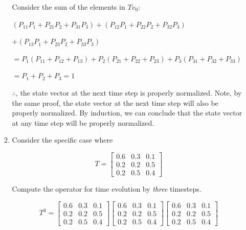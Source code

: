 \documentclass[fleqn]{article}
\makeatletter
\newenvironment{equationCenter}{\@fleqnfalse\begin{equation*}}{\end{equation*}}
\makeatother
\begin{document}
\begin{enumerate}[nolistsep]
\begin{enumerate}
			Consider the sum of the elements in $Tv_0$:
			
			$(P_{11}P_{1} + P_{21}P_{2} + P_{31}P_{3}) + (P_{12}P_{1} + P_{22}P_{2} + P_{32}P_{3})$
			
			$ + (P_{13}P_{1} + P_{23}P_{2} + P_{33}P_{3})$
			
			$ = P_{1}(P_{11} + P_{12} + P_{13}) + P_{2}(P_{21} + P_{22} + P_{23}) + P_{3}(P_{31} + P_{32} + P_{33})$
			
			$ = P_{1} + P_{2} + P_{3} = 1$
			
			$\therefore$, the state vector at the next time step is properly normalized. Note, by the same proof, the state vector at the next time step will also be properly normalized. By induction, we can conclude that the state vector at any time step will be properly normalized.
			 
			\item Consider the specific case where
			
			\begin{equationCenter}
				T = \begin{bmatrix}
					0.6 & 0.3 & 0.1\\
					0.2 & 0.2 & 0.5\\
					0.2 & 0.5 & 0.4
				\end{bmatrix}
			\end{equationCenter}
			
			Compute the operator for time evolution by \textit{three} timesteps.
			
			\begin{equation*}
				T^3 = \begin{bmatrix}
					0.6 & 0.3 & 0.1\\
					0.2 & 0.2 & 0.5\\
					0.2 & 0.5 & 0.4
				\end{bmatrix}\begin{bmatrix}
					0.6 & 0.3 & 0.1\\
					0.2 & 0.2 & 0.5\\
					0.2 & 0.5 & 0.4
				\end{bmatrix}\begin{bmatrix}
					0.6 & 0.3 & 0.1\\
					0.2 & 0.2 & 0.5\\
					0.2 & 0.5 & 0.4
				\end{bmatrix}
			\end{equation*}
			

\end{enumerate}
\end{enumerate}
\end{document}
